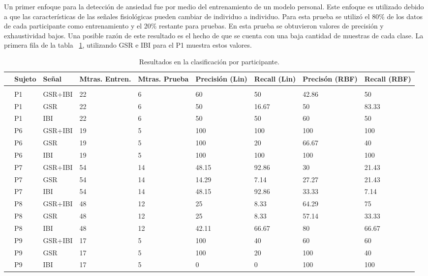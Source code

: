 Un primer enfoque para la detecci\'on de ansiedad fue por medio del entrenamiento de un modelo personal. Este enfoque es utilizado debido a que las caracter\'isticas de las se\~nales fisiol\'ogicas pueden cambiar de individuo a individuo. Para esta prueba se utiliz\'o el 80\% de los datos de cada participante como entrenamiento y el 20\% restante para pruebas. En esta prueba se obtuvieron valores de precisi\'on y exhaustividad bajos.
Una posible raz\'on de este resultado es el hecho de que se cuenta con una baja cantidad de muestras de cada clase. La primera fila de la tabla ~\ref{table:resultindiv}, utilizando GSR e IBI para el P1 muestra estos valores.
\begin{table}[h!]
        \footnotesize
        \centering
        \caption{Resultados en la clasificaci\'on por participante.}
\label{table:resultindiv}
        \begin{tabular}{m{.2cm}m{1.5cm}m{1.5cm}m{1.5cm}m{1.5cm}m{1.5cm}m{1.5cm}m{1.5cm}m{2.5cm}}
                \hline\noalign{\smallskip}
    &\textbf{Sujeto}&\textbf{Se\~nal} &\textbf{Mtras. Entren.}&\textbf{Mtras. Prueba}&\textbf{Precisi\'on (Lin)}& \textbf{Recall (Lin)} & \textbf{Precis\'on (RBF)} &\textbf{Recall (RBF)}\\
	\hline                
 \\\noalign{\smallskip}
		&P1&GSR+IBI&22&6&60&50&42.86&50\\
		&P1&GSR&22&6&50&16.67&50&83.33\\
		&P1&IBI&22&6&50&50&60&50\\
		&P6&GSR+IBI&19&5&100&100&100&100\\
		&P6&GSR&19&5&100&20&66.67&40\\
		&P6&IBI&19&5&100&100&100&100\\
		&P7&GSR+IBI&54&14&48.15&92.86&30&21.43\\
		&P7&GSR&54&14&14.29&7.14&27.27&21.43\\
		&P7&IBI&54&14&48.15&92.86&33.33&7.14\\
		&P8&GSR+IBI&48&12&25&8.33&64.29&75\\
		&P8&GSR&48&12&25&8.33&57.14&33.33\\
		&P8&IBI&48&12&42.11&66.67&80&66.67\\
		&P9&GSR+IBI&17&5&100&40&60&60\\
		&P9&GSR&17&5&100&20&100&40\\
		&P9&IBI&17&5&0&0&100&100\\
    \end{tabular}
\end{table}

